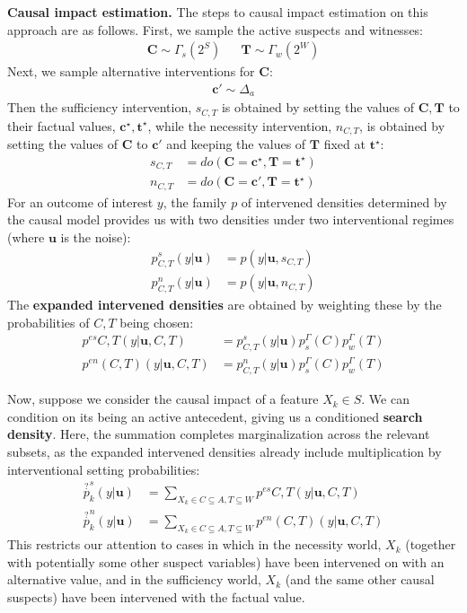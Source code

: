 \documentclass[anon,12pt]{clear2025} %
\begin{document}
\vspace{2mm}
\noindent \textbf{Causal impact estimation.} 
The steps to causal impact estimation on this approach are as follows. First, we sample the active suspects and witnesses:
\begin{align}
\mathbf{C} \sim \Gamma_s(2^S) & & \mathbf{T} \sim \Gamma_w(2^W)
\end{align}
\noindent Next, we sample alternative interventions for $\mathbf{C}$: 
\begin{align}
\mathbf{c'} \sim \Delta_a
\end{align}
Then the sufficiency intervention, $s_{C,T}$ is obtained by setting the values of $\mathbf{C}, \mathbf{T}$ to their factual values, $\mathbf{c}^\star, \mathbf{t}^\star$, while the necessity intervention, $n_{C, T}$, is obtained by setting the values of $\mathbf{C}$ to $\mathbf{c'}$ and keeping the values of $\mathbf{T}$ fixed at $\mathbf{t}^\star$:
\begin{align}
s_{C,T}  & = do(\mathbf{C} = \mathbf{c^\star}, \mathbf{T} = \mathbf{t^\star}) \\
n_{C,T} & = do(\mathbf{C} = \mathbf{c'}, \mathbf{T} = \mathbf{t^\star})
\end{align}
For an outcome of interest $y$, the family $p$ of intervened densities determined by the causal model provides us with two densities under two interventional regimes (where $\mathbf{u}$ is the noise):
\begin{align}
p^s_{C,T}(y\vert  \mathbf{u}) & = p (y \vert \mathbf{u}, s_{C, T})\\
p^n_{C,T}(y\vert \mathbf{u}) & = p(y \vert \mathbf{u}, n_{C,T})
\end{align} The \textbf{expanded intervened densities} are obtained by weighting these by the probabilities of $C, T$ being chosen:
\begin{align}
p^{es}{C,T}(y \vert \mathbf{u}, C, T) & = p^s_{C,T}(y\vert  \mathbf{u})  p^\Gamma_s(C) p^\Gamma_w(T)\\ 
p^{en}(C, T)( y \vert \mathbf{u}, C, T) & = p^n_{C,T}(y\vert \mathbf{u})    p^\Gamma_s(C) p^\Gamma_w(T)
\end{align}

Now, suppose we consider the causal impact of a feature $X_k \in S$. We can condition on its being an active antecedent, giving us a conditioned  \textbf{search density}. Here, the summation completes marginalization across the relevant subsets, as the expanded intervened densities already include multiplication by interventional setting probabilities:
\begin{align}
\overset{?}{p}^s_k(y \vert \mathbf{u})    &= \sum_{X_k \in C \subseteq A, T\subseteq W} p^{es}{C,T}(y \vert \mathbf{u}, C, T) \\ 
\overset{?}{p}^n_k(y \vert \mathbf{u})   & = \sum_{X_k \in C \subseteq A, T\subseteq W}p^{en}(C, T)( y \vert \mathbf{u}, C, T) 
\end{align}
This restricts our attention to cases in which in the necessity world, $X_k$ (together with potentially some other suspect variables)  have been intervened on with an alternative value, and in the sufficiency world, $X_k$ (and the same other causal suspects) have been intervened with the factual value. 
\end{document}
